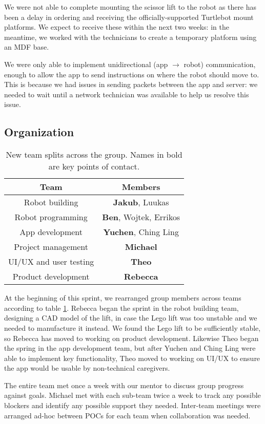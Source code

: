 \documentclass{article}
\begin{document}
We were not able to complete mounting the scissor lift to the robot as there has been a delay in ordering and receiving the officially-supported Turtlebot mount platforms. We expect to receive these within the next two weeks: in the meantime, we worked with the technicians to create a temporary platform using an MDF base.

We were only able to implement unidirectional (app $\rightarrow$ robot) communication, enough to allow the app to send instructions on where the robot should move to. This is because we had issues in sending packets between the app and server: we needed to wait until a network technician was available to help us resolve this issue. 


\subsection{Organization}
\begin{table}[]
  \begin{tabular}{c|c}
    Team & Members \\
    \hline
    Robot building & {\bf Jakub}, Luukas \\
    Robot programming & {\bf Ben}, Wojtek, Errikos \\
    App development & {\bf Yuchen}, Ching Ling \\
    Project management & {\bf Michael}  \\
    UI/UX and user testing & {\bf Theo}  \\
    Product development & {\bf Rebecca}  
  \end{tabular}
  \caption{New team splits across the group. Names in bold are key points of contact.}
  \label{tab:group-split}
\end{table}

At the beginning of this sprint, we rearranged group members across teams according to table \ref{tab:group-split}. Rebecca began the sprint in the robot building team, designing a CAD model of the lift, in case the Lego lift was too unstable and we needed to manufacture it instead. We found the Lego lift to be sufficiently stable, so Rebecca has moved to working on product development. Likewise Theo began the spring in the app development team, but after Yuchen and Ching Ling were able to implement key functionality, Theo moved to working on UI/UX to ensure the app would be usable by non-technical caregivers.

The entire team met once a week with our mentor to discuss group progress against goals. Michael met with each sub-team twice a week to track any possible blockers and identify any possible support they needed. Inter-team meetings were arranged ad-hoc between POCs for each team when collaboration was needed. 
\end{document}
